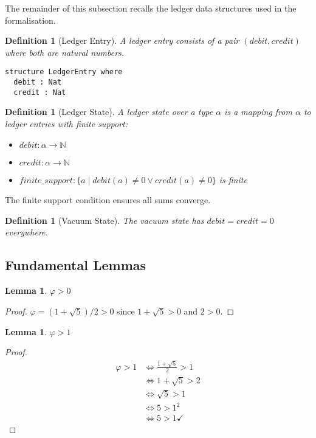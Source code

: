 \documentclass[11pt]{article}
\numberwithin{equation}{section}
\newtheorem{lemma}[theorem]{Lemma}
\newtheorem{definition}[theorem]{Definition}
\theoremstyle{remark}
\newcommand{\N}{\mathbb{N}}
\begin{document}
The remainder of this subsection recalls the ledger data structures used in the
formalisation.

\begin{definition}[Ledger Entry]
A ledger entry consists of a pair $(debit, credit)$ where both are natural numbers.
\begin{lstlisting}
structure LedgerEntry where
  debit : Nat
  credit : Nat
\end{lstlisting}
\end{definition}

\begin{definition}[Ledger State]
A ledger state over a type $\alpha$ is a mapping from $\alpha$ to ledger entries with finite support:
\begin{itemize}
\item $debit : \alpha \to \N$
\item $credit : \alpha \to \N$  
\item $finite\_support : \{a \mid debit(a) \neq 0 \vee credit(a) \neq 0\}$ is finite
\end{itemize}
\end{definition}

The finite support condition ensures all sums converge.

\begin{definition}[Vacuum State]
The vacuum state has $debit = credit = 0$ everywhere.
\end{definition}

\subsection{Fundamental Lemmas}

\begin{lemma}
$\varphi > 0$
\end{lemma}
\begin{proof}
$\varphi = (1 + \sqrt{5})/2 > 0$ since $1 + \sqrt{5} > 0$ and $2 > 0$.
\end{proof}

\begin{lemma}
$\varphi > 1$
\end{lemma}
\begin{proof}
\begin{align}
\varphi > 1 &\iff \frac{1 + \sqrt{5}}{2} > 1\\
&\iff 1 + \sqrt{5} > 2\\
&\iff \sqrt{5} > 1\\
&\iff 5 > 1^2\\
&\iff 5 > 1 \checkmark
\end{align}
\end{proof}
\end{document}
